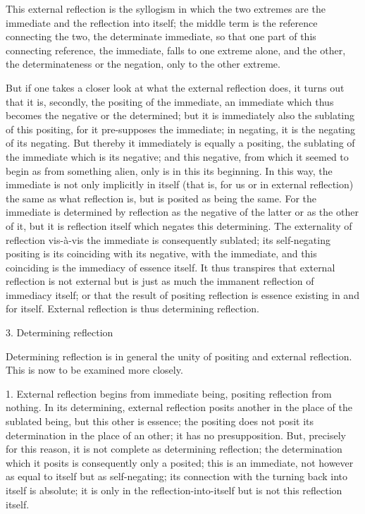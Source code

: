 This external reflection is the syllogism in which
the two extremes are the immediate and the reflection into itself;
the middle term is the reference connecting the two,
the determinate immediate, so that one part of this connecting reference,
the immediate, falls to one extreme alone, and the other,
the determinateness or the negation, only to the other extreme.

But if one takes a closer look at what the external reflection does,
it turns out that it is, secondly, the positing of the immediate,
an immediate which thus becomes the negative or the determined;
but it is immediately also the sublating of this positing,
for it pre-supposes the immediate;
in negating, it is the negating of its negating.
But thereby it immediately is equally a positing,
the sublating of the immediate which is its negative;
and this negative, from which it seemed to begin
as from something alien,
only is in this its beginning.
In this way, the immediate is not only implicitly in itself
(that is, for us or in external reflection)
the same as what reflection is,
but is posited as being the same.
For the immediate is determined by reflection as
the negative of the latter or as the other of it,
but it is reflection itself which negates this determining.
The externality of reflection vis-à-vis
the immediate is consequently sublated;
its self-negating positing is its coinciding
with its negative, with the immediate,
and this coinciding is the immediacy of essence itself.
It thus transpires that external reflection is not external
but is just as much the immanent reflection of immediacy itself;
or that the result of positing reflection is
essence existing in and for itself.
External reflection is thus determining reflection.

3. Determining reflection

Determining reflection is in general
the unity of positing and external reflection.
This is now to be examined more closely.

1. External reflection begins from immediate being,
positing reflection from nothing.
In its determining, external reflection posits another in the
place of the sublated being, but this other is essence;
the positing does not posit its determination in the place of an other;
it has no presupposition.
But, precisely for this reason,
it is not complete as determining reflection;
the determination which it posits is consequently only a posited;
this is an immediate, not however as equal to itself
but as self-negating;
its connection with the turning back into itself is absolute;
it is only in the reflection-into-itself
but is not this reflection itself.

